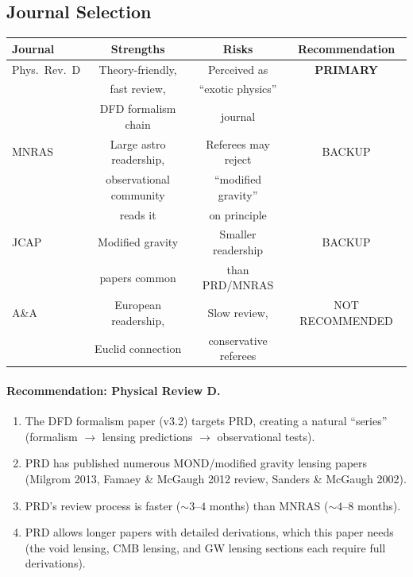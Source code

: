 \documentclass[11pt,a4paper]{article}
\begin{document}
\subsection{Journal Selection}

\begin{center}
\begin{tabular}{lccc}
\toprule
Journal & Strengths & Risks & Recommendation \\
\midrule
Phys.\ Rev.\ D & Theory-friendly, & Perceived as & \textbf{PRIMARY} \\
 & fast review, & ``exotic physics'' & \\
 & DFD formalism chain & journal & \\
\midrule
MNRAS & Large astro readership, & Referees may reject & BACKUP \\
 & observational community & ``modified gravity'' & \\
 & reads it & on principle & \\
\midrule
JCAP & Modified gravity & Smaller readership & BACKUP \\
 & papers common & than PRD/MNRAS & \\
\midrule
A\&A & European readership, & Slow review, & NOT RECOMMENDED \\
 & Euclid connection & conservative referees & \\
\bottomrule
\end{tabular}
\end{center}

\paragraph{Recommendation: Physical Review D.}
\begin{enumerate}[label=(\roman*)]
\item The DFD formalism paper (v3.2) targets PRD, creating a natural
  ``series'' (formalism $\to$ lensing predictions $\to$ observational tests).
\item PRD has published numerous MOND/modified gravity lensing papers
  (Milgrom 2013, Famaey \& McGaugh 2012 review, Sanders \& McGaugh 2002).
\item PRD's review process is faster ($\sim 3$--$4$ months) than MNRAS
  ($\sim 4$--$8$ months).
\item PRD allows longer papers with detailed derivations, which this
  paper needs (the void lensing, CMB lensing, and GW lensing sections
  each require full derivations).
\end{enumerate}
\end{document}
